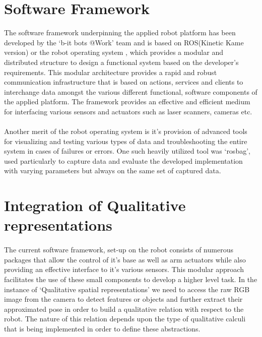 \section{Software Framework}
The software framework underpinning the applied robot platform has been developed by the `b-it bots @Work' team and is based on ROS(Kinetic Kame version) or the robot operating system \cite{quigley2009ros}, which provides a modular and distributed structure to design a functional system based on the developer's requirements. This modular architecture provides a rapid and robust communication infrastructure that is based on actions, services and clients to interchange data amongst the various different functional, software components of the applied platform. The framework provides an effective and efficient medium for interfacing various sensors and actuators such as laser scanners, cameras etc. 

\paragraph{}Another merit of the robot operating system is it's provision of advanced tools for visualizing and testing various types of data and troubleshooting the entire system in cases of failures or errors. One such heavily utilized tool was `rosbag', used particularly to capture data \cite{Hegger2012} and evaluate the developed implementation with varying parameters but always on the same set of captured data.

\section{Integration of Qualitative representations}
\paragraph{}The current software framework, set-up on the robot consists of numerous packages that allow the control of it's base as well as arm actuators while also providing an effective interface to it's various sensors. This modular approach facilitates the use of these small components to develop a higher level task. In the instance of `Qualitative spatial representations' we need to access the raw RGB image from the camera to detect features or objects and further extract their approximated pose in order to build a qualitative relation with respect to the robot. The nature of this relation depends upon the type of qualitative calculi that is being implemented in order to define these abstractions.

